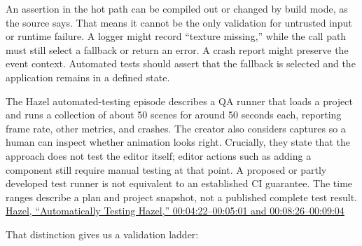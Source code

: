 An assertion in the hot path can be compiled out or changed by build mode, as the source says. That means it cannot be the only validation for untrusted input or runtime failure. A logger might record ``texture missing,'' while the call path must still select a fallback or return an error. A crash report might preserve the event context. Automated tests should assert that the fallback is selected and the application remains in a defined state.

The Hazel automated-testing episode describes a QA runner that loads a project and runs a collection of about 50 scenes for around 50 seconds each, reporting frame rate, other metrics, and crashes. The creator also considers captures so a human can inspect whether animation looks right. Crucially, they state that the approach does not test the editor itself; editor actions such as adding a component still require manual testing at that point. A proposed or partly developed test runner is not equivalent to an established CI guarantee. The time ranges describe a plan and project snapshot, not a published complete test result. \href{https://www.youtube.com/watch?v=0RDI41oBcmQ&t=4m22s}{Hazel, ``Automatically Testing Hazel,'' 00:04:22--00:05:01 and 00:08:26--00:09:04}

That distinction gives us a validation ladder:

